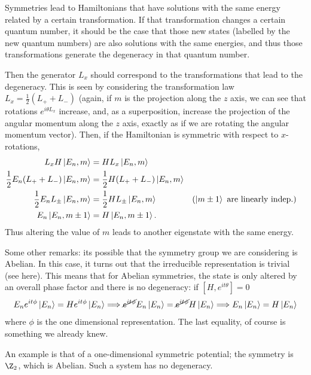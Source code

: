 \documentclass{report}
\begin{document}
\begin{thinbluebox}
Symmetries lead to Hamiltonians that have solutions with the same energy related 
by a certain transformation. If that transformation changes a certain quantum 
number, it should be the case that those new states (labelled by the new quantum 
numbers) are also solutions with the same energies, and thus those transformations 
generate the degeneracy in that quantum number. 
\end{thinbluebox}
Then the generator $ L_x $ should correspond to the transformations that lead 
to the degeneracy. This is seen by considering the transformation law $ L_x =
\frac{1}{2}(L_+ + L_-) $ (again, if $ m $ is the projection along the $ z $ axis, 
we can see that rotations $ e^{i\theta L_x} $ increase, and, as a superposition, 
increase the projection of the angular momentum along the $ z $ axis, exactly as 
if we are rotating the angular momentum vector). Then, if the Hamiltonian is
symmetric with respect to $ x $-rotations, 
\begin{align*}
	L_x H\ket{E_n, m} &= HL_x\ket{E_n, m}\\
	\frac{1}{2} E_n(L_+ + L_-)\ket{E_n, m} 
		&= \frac{1}{2}H(L_+ + L_-)\ket{E_n, m} \\
	\frac{1}{2}E_n L_{\pm}\ket{E_n, m} 
		&= \frac{1}{2}H L_{\pm} \ket{E_n, m}
		&& (\ket{m\pm 1} \text{ are linearly indep.})\\
	E_n \ket{E_n, m\pm 1} 
		&= H \ket{E_n, m\pm 1}.
\end{align*}
Thus altering the value of $ m $ leads to another eigenstate with the same 
energy.

Some other remarks: its possible that the symmetry group we are considering 
is Abelian. In this case, it turns out that the irreducible representation 
is trivial (see here). This means that for Abelian symmetries, the state 
is only altered by an overall phase factor and there is no degeneracy:
if $ \left[ H, e^{it\theta} \right] =0$
\begin{equation*}
	E_ne^{it \phi}\ket{E_n} = He^{it \phi}\ket{E_n}
	\Longrightarrow \cancel{e^{it \phi}}E_n \ket{E_n}
		= \cancel{e^{it \phi}}H\ket{E_n}
	\Longrightarrow 
	E_n \ket{E_n} = H\ket{E_n}
\end{equation*}
where $ \phi $ is the one dimensional representation. The last equality, of
course is something we already knew. 

An example is that of a one-dimensional symmetric potential; the symmetry is 
$ \Z_2 $, which is Abelian. Such a system has no degeneracy. 
\end{document}
